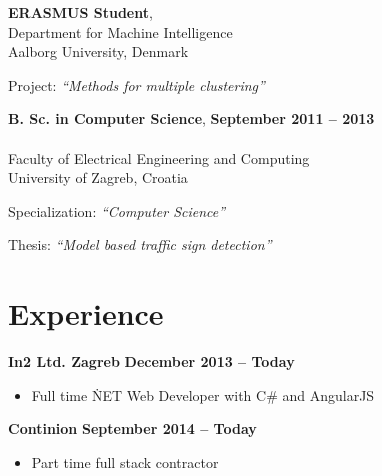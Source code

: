\documentclass[margin,line]{resume}
\begin{document}
\begin{resume}
    \textbf{ERASMUS Student}, \\
    Department for Machine Intelligence \\
    Aalborg University, Denmark
    \vspace{1mm}%
    \begin{list2}
        \item Project: \textsl{``Methods for multiple clustering''} 
    \end{list2}


    \textbf{B. Sc. in Computer Science}, \hfill \textbf{ September 2011 -- 2013 }\vspace{-3mm}\\\vspace{-1mm}%
    \\Faculty of Electrical Engineering and Computing
    \\University of Zagreb, Croatia \vspace{1mm}%
    \textsl{} 
    \begin{list2}
        \item Specialization: \textsl{``Computer Science''} 
        \item Thesis: \textsl{``Model based traffic sign detection''} 
    \end{list2}

    \section{\mysidestyle Experience} 

    \textbf{In2 Ltd. Zagreb} \vspace{1mm} \hfill \textbf{ December 2013 -- Today }
    \begin{itemize}
      \item Full time \.NET Web Developer with C\# and AngularJS
            \vspace{-1mm}
    \end{itemize}

    \textbf{Continion} \vspace{1mm} \hfill \textbf{ September 2014 -- Today }
    \begin{itemize}
      \item Part time full stack contractor
            \vspace{-1mm}
    \end{itemize}


\end{resume}
\end{document}
